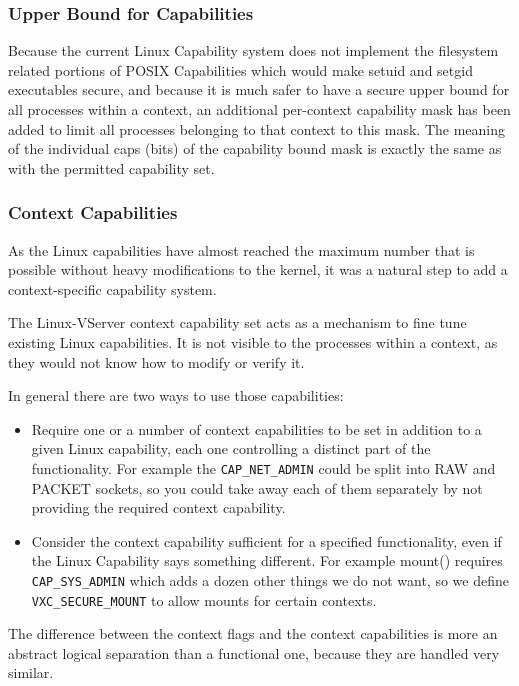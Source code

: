\subsubsection{Upper Bound for Capabilities}

Because the current Linux Capability system does not implement the filesystem
related portions of POSIX Capabilities which would make setuid and setgid
executables secure, and because it is much safer to have a secure upper bound
for all processes within a context, an additional per-context capability mask
has been added to limit all processes belonging to that context to this mask.
The meaning of the individual caps (bits) of the capability bound mask is
exactly the same as with the permitted capability set. 

\subsubsection{Context Capabilities}

As the Linux capabilities have almost reached the maximum number that is
possible without heavy modifications to the kernel, it was a natural step to
add a context-specific capability system.

The Linux-VServer context capability set acts as a mechanism to fine tune
existing Linux capabilities. It is not visible to the processes within a
context, as they would not know how to modify or verify it. 

In general there are two ways to use those capabilities: 

\begin{itemize}
\item Require one or a number of context capabilities to be set in addition to
	a given Linux capability, each one controlling a distinct part of the
	functionality. For example the \verb,CAP_NET_ADMIN, could be split into RAW
	and PACKET sockets, so you could take away each of them separately by not
	providing the required context capability. 

\item Consider the context capability sufficient for a specified functionality,
	even if the Linux Capability says something different. For example mount()
	requires \verb,CAP_SYS_ADMIN, which adds a dozen other things we do not
	want, so we define \verb,VXC_SECURE_MOUNT, to allow mounts for certain
	contexts. 
\end{itemize}

The difference between the context flags and the context capabilities is more
an abstract logical separation than a functional one, because they are handled
very similar.


